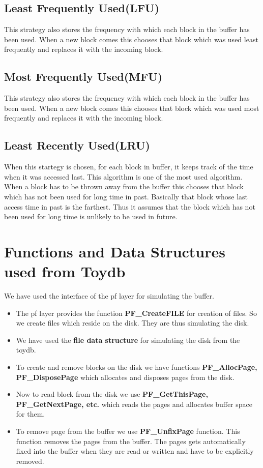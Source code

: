 \subsection*{{Least Frequently Used(LFU)}}
This strategy also stores the frequency with which each block in the buffer has been used. When a new block comes this chooses that block which was used least frequently and replaces it with the incoming block.


\subsection*{{Most Frequently Used(MFU)}}

This strategy also stores the frequency with which each block in the buffer has been used. When a new block comes this chooses that block which was used most frequently and replaces it with the incoming block.


\subsection*{{Least Recently Used(LRU)}}
When this startegy is chosen, for each block in buffer, it keeps track of the time when it was accessed last.
This algorithm is one of the most used algorithm. When a block has to be thrown away from the buffer this chooses that block which has not been used for long time in past. Basically that block whose last access time in past is the farthest. Thus it assumes that the block which has not been used for long time is unlikely to be used in future.

\section*{{Functions and Data Structures used from Toydb}}

We have used the interface of the pf layer for simulating the buffer.

\begin{itemize}

\item The pf layer provides the function \textbf{PF\_CreateFILE} for creation of files. So we create files which reside on the disk. They are thus simulating the disk. 
\item We have used the \textbf{file data structure} for simulating the disk from the toydb. 
\item To create and remove blocks on the disk we have functions \textbf{PF\_AllocPage, PF\_DisposePage} which allocates and disposes pages from the disk. 
\item Now to read block from the disk we use \textbf{PF\_GetThisPage, PF\_GetNextPage, etc.} which reads the pages and allocates buffer space for them.  
\item To remove page from the buffer we use \textbf{PF\_UnfixPage} function. This function removes the pages from the buffer. The pages gets automatically fixed into the buffer when they are read or written and have to be explicitly removed. 
\end{itemize}

